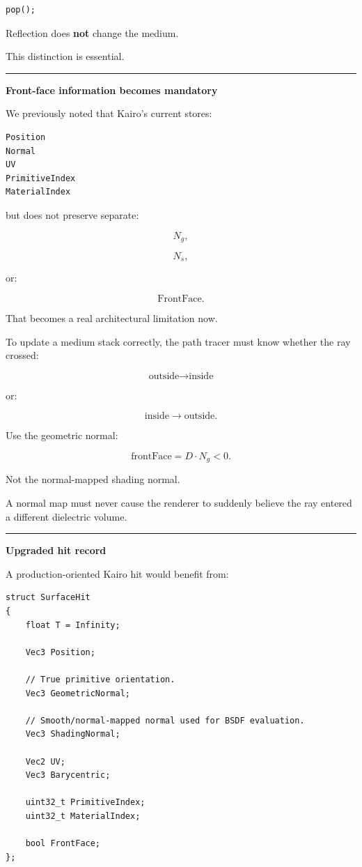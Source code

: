 \begin{verbatim}
pop();
\end{verbatim}

Reflection does \textbf{not} change the medium.

This distinction is essential.

\begin{center}\rule{0.5\linewidth}{0.5pt}\end{center}

\textbf{Front-face information becomes mandatory}

We previously noted that Kairo's current  stores:

\begin{verbatim}
Position
Normal
UV
PrimitiveIndex
MaterialIndex
\end{verbatim}

but does not preserve separate:

\[
N_g,
\]

\[
N_s,
\]

or:

\[
\text{FrontFace}.
\]

That becomes a real architectural limitation now.

To update a medium stack correctly, the path tracer must know whether the ray crossed:

\[
\text{outside}\rightarrow\text{inside}
\]

or:

\[
\text{inside}\rightarrow\text{outside}.
\]

Use the geometric normal:

\[
\boxed{
\text{frontFace}
=
D\cdot N_g<0.
}
\]

Not the normal-mapped shading normal.

A normal map must never cause the renderer to suddenly believe the ray entered a different dielectric volume.

\begin{center}\rule{0.5\linewidth}{0.5pt}\end{center}

\textbf{Upgraded hit record}

A production-oriented Kairo hit would benefit from:

\begin{verbatim}
struct SurfaceHit
{
    float T = Infinity;

    Vec3 Position;

    // True primitive orientation.
    Vec3 GeometricNormal;

    // Smooth/normal-mapped normal used for BSDF evaluation.
    Vec3 ShadingNormal;

    Vec2 UV;
    Vec3 Barycentric;

    uint32_t PrimitiveIndex;
    uint32_t MaterialIndex;

    bool FrontFace;
};
\end{verbatim}

